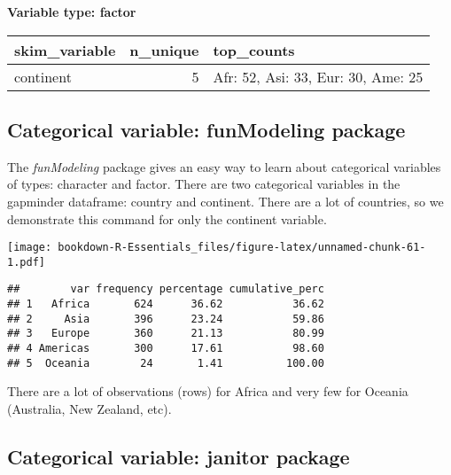 \documentclass[]{book}
\newenvironment{Shaded}{\begin{snugshade}}{\end{snugshade}}
\newcommand{\KeywordTok}[1]{\textcolor[rgb]{0.13,0.29,0.53}{\textbf{#1}}}
\newcommand{\CommentTok}[1]{\textcolor[rgb]{0.56,0.35,0.01}{\textit{#1}}}
\newcommand{\OperatorTok}[1]{\textcolor[rgb]{0.81,0.36,0.00}{\textbf{#1}}}
\newcommand{\NormalTok}[1]{#1}
\begin{document}
\textbf{Variable type: factor}

\begin{tabular}{l|r|l}
\hline
skim\_variable & n\_unique & top\_counts\\
\hline
continent & 5 & Afr: 52, Asi: 33, Eur: 30, Ame: 25\\
\hline
\end{tabular}

\subsection{Categorical variable: funModeling
package}\label{categorical-variable-funmodeling-package}

The \emph{funModeling} package gives an easy way to learn about
categorical variables of types: character and factor. There are two
categorical variables in the gapminder dataframe: country and continent.
There are a lot of countries, so we demonstrate this command for only
the continent variable.

\begin{Shaded}
\end{Shaded}

\texttt{[image: bookdown-R-Essentials\_files/figure-latex/unnamed-chunk-61-1.pdf]}

\begin{verbatim}
##        var frequency percentage cumulative_perc
## 1   Africa       624      36.62           36.62
## 2     Asia       396      23.24           59.86
## 3   Europe       360      21.13           80.99
## 4 Americas       300      17.61           98.60
## 5  Oceania        24       1.41          100.00
\end{verbatim}

There are a lot of observations (rows) for Africa and very few for
Oceania (Australia, New Zealand, etc).

\subsection{Categorical variable: janitor
package}\label{categorical-variable-janitor-package}
\end{document}
